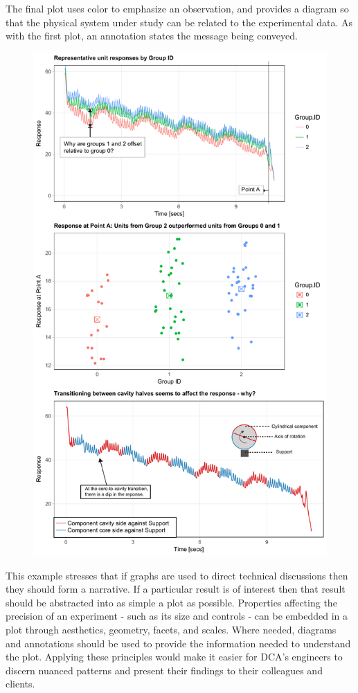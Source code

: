 \documentclass[11pt,a4paper,article]{memoir} %
\begin{document}
 The final plot uses color to emphasize an observation, and provides a diagram so that the physical system under study can be related to the experimental data. As with the first plot, an annotation states the message being conveyed.
\begin{figure}
\includegraphics[width=\textwidth]{better_charts.pdf}
\caption{}
\label{fig:better_chart}
\end{figure}

This example stresses that if graphs are used to direct technical discussions then they should form a narrative. If a particular result is of interest then that result should be abstracted into as simple a plot as possible. Properties affecting the precision of an experiment - such as its size and controls - can be embedded in a plot through aesthetics, geometry, facets, and scales. Where needed, diagrams and annotations should be used to provide the information needed to understand the plot. Applying these principles would make it easier for DCA's engineers to discern nuanced patterns and present their findings to their colleagues and clients.
\end{document}
